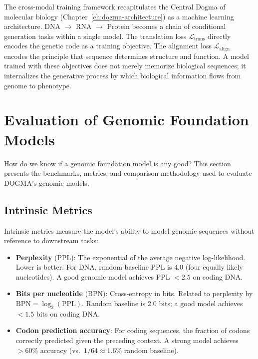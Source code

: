 \begin{keyinsight}
The cross-modal training framework recapitulates the Central Dogma of molecular biology (Chapter~\ref{ch:dogma-architecture}) as a machine learning architecture. DNA $\to$ RNA $\to$ Protein becomes a chain of conditional generation tasks within a single model. The translation loss $\mathcal{L}_{\text{trans}}$ directly encodes the genetic code as a training objective. The alignment loss $\mathcal{L}_{\text{align}}$ encodes the principle that sequence determines structure and function. A model trained with these objectives does not merely memorize biological sequences; it internalizes the generative process by which biological information flows from genome to phenotype.
\end{keyinsight}

\section{Evaluation of Genomic Foundation Models}
\label{sec:evaluation}

How do we know if a genomic foundation model is any good? This section presents the benchmarks, metrics, and comparison methodology used to evaluate DOGMA's genomic models.

\subsection{Intrinsic Metrics}

Intrinsic metrics measure the model's ability to model genomic sequences without reference to downstream tasks:

\begin{itemize}[leftmargin=1.5em]
  \item \textbf{Perplexity} (PPL): The exponential of the average negative log-likelihood. Lower is better. For DNA, random baseline PPL is $4.0$ (four equally likely nucleotides). A good genomic model achieves PPL $< 2.5$ on coding DNA.
  \item \textbf{Bits per nucleotide} (BPN): Cross-entropy in bits. Related to perplexity by $\text{BPN} = \log_2(\text{PPL})$. Random baseline is 2.0 bits; a good model achieves $< 1.5$ bits on coding DNA.
  \item \textbf{Codon prediction accuracy}: For coding sequences, the fraction of codons correctly predicted given the preceding context. A strong model achieves $> 60\%$ accuracy (vs.\ $1/64 \approx 1.6\%$ random baseline).
\end{itemize}

